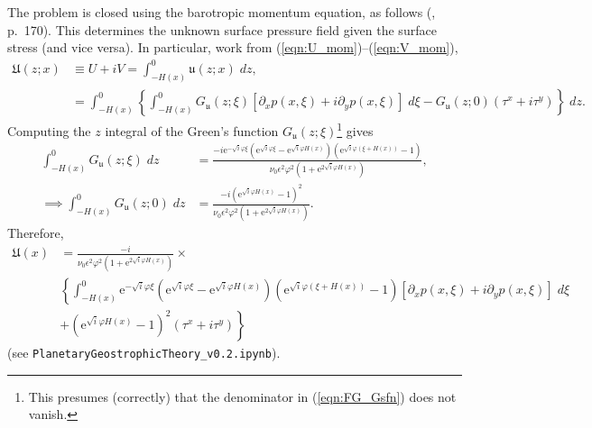 \documentclass[10pt]{amsart}
\begin{document}
The problem is closed using the barotropic momentum equation, as follows (\citealt{salmon98}, p.~170).
This determines the unknown surface pressure field given the surface stress (and vice versa).
In particular, work from (\ref{eqn:U_mom})--(\ref{eqn:V_mom}),
\begin{align}
\mathfrak{U} (z;x) & \equiv U + i V = \int_{-H(x)}^{0} \mathfrak{u} (z;x) \; dz , \label{eqn:depth_integrated_flow_def} \\
& = \int_{-H(x)}^0 \left\{ \int_{-H(x)}^{0} G_{ \mathfrak{u}} (z; \xi) \left[ \partial_x p( x, \xi) + i \partial_y p( x, \xi) \right] \; d \xi 
-  G_{\mathfrak{u}} (z; 0)  \left( \tau^x + i \tau^y \right)  \right\} \; dz.
\end{align}
Computing the $z$ integral of the Green's function $G_{\mathfrak{u}} (z; \xi)$\footnote{This presumes (correctly) that the denominator in (\ref{eqn:FG_Gsfn}) does not vanish.} gives 
\begin{align}
\int_{-H(x)}^0 G_{ \mathfrak{u}}(z;\xi) \; dz & = 
\frac{- i \mathrm{e}^{-\sqrt{i} \varphi \xi} 
\left(
\mathrm{e}^{\sqrt{i} \varphi \xi} - 
\mathrm{e}^{\sqrt{i} \varphi H(x)} 
\right) \left(
\mathrm{e}^{\sqrt{i} \varphi  \left( \xi + H(x) \right)} - 1
\right)
} { \nu_0 \epsilon^2 \varphi^2  \left(1 + \mathrm{e}^{2 \sqrt{i} \varphi H(x )} \right)} , \nonumber \\
\implies \int_{-H(x)}^0 G_{ \mathfrak{u}}(z;0) \; dz & = 
\frac{ - i \left( 
\mathrm{e}^{\sqrt{i} \varphi  H(x) }   - 1   
\right)^2
} { \nu_0 \epsilon^2 \varphi^2  \left(1 + \mathrm{e}^{2 \sqrt{i} \varphi H(x )} \right)} .
\end{align}
Therefore,
\begin{align}
\mathfrak{U} (x) & = 
\frac{-i }{{ \nu_0 \epsilon^2 \varphi^2  \left(1 + \mathrm{e}^{2 \sqrt{i} \varphi H(x )} \right)} } \times \nonumber \\
&\left\{
 \int_{-H(x)}^{0} 
\mathrm{e}^{-\sqrt{i} \varphi \xi} 
\left(
\mathrm{e}^{\sqrt{i} \varphi \xi} - 
\mathrm{e}^{\sqrt{i} \varphi H(x)} 
\right) \left(
\mathrm{e}^{\sqrt{i} \varphi  \left( \xi + H(x) \right)} - 1
\right)
 \left[ \partial_x p( x, \xi) + i \partial_y p( x, \xi) \right] \; d \xi  \right. \nonumber  \\
& + \left.
\left( 
\mathrm{e}^{\sqrt{i} \varphi  H(x) }   - 1   
\right)^2
\left( \tau^x + i \tau^y \right)   \right\}
\label{eqn:UV_expression}
\end{align}
(see \texttt{PlanetaryGeostrophicTheory\_v0.2.ipynb}).
\end{document}
